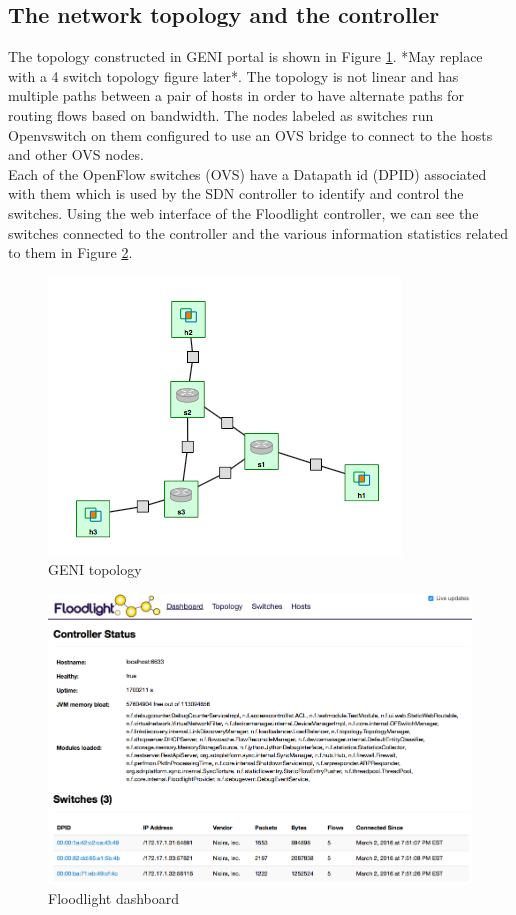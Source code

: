 \documentclass[paper=a4, fontsize=11pt]{scrartcl}	%
\numberwithin{equation}{section}		%
\numberwithin{figure}{section}			%
\numberwithin{table}{section}				%
\begin{document}
\subsection{The network topology and the controller}
The topology constructed in GENI portal is shown in Figure \ref{Fig 4.1}. *May replace with a 4 switch topology figure later*. The topology is not linear and has multiple paths between a pair of hosts in order to have alternate paths for routing flows based on bandwidth. The nodes labeled as switches run Openvswitch on them configured to use an OVS bridge to connect to the hosts and other OVS nodes.
\\
Each of the OpenFlow switches (OVS) have a Datapath id (DPID) associated with them which is used by the SDN controller to identify and control the switches. Using the web interface of the Floodlight controller, we can see the switches connected to the controller and the various information statistics related to them in Figure \ref{Fig 4.2}.
\begin{figure}[H]
\begin{center}
\includegraphics[scale=0.55]{topology.png}   
\end{center}
 \caption{GENI topology}
 \label{Fig 4.1}
\end{figure}
\begin{figure}[H]
\begin{center}
\includegraphics[scale=0.45]{floodlight.png}   
\end{center}
 \caption{Floodlight dashboard}
 \label{Fig 4.2}
\end{figure}
\end{document}
